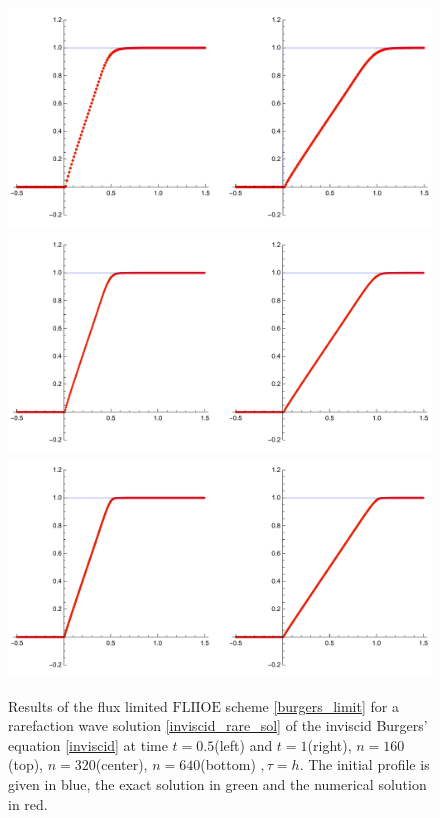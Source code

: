 \documentclass[../include.tex]{subfiles}
\begin{document}
\begin{figure}[H]
	\centering
	\includegraphics[width=.9\textwidth]{figures/inviscidRare_160_h}
	\includegraphics[width=.9\textwidth]{figures/inviscidRare_320_h}
	\includegraphics[width=.9\textwidth]{figures/inviscidRare_640_h}
	\caption{Results of the flux limited $\mathrm{FLIIOE}$ scheme \eqref{burgers_limit} for a rarefaction wave solution \eqref{inviscid_rare_sol} of the inviscid Burgers' equation \eqref{inviscid} at time $ t=0.5 $(left) and $ t=1 $(right), $ n=160 $(top), $ n = 320 $(center), $ n = 640 $(bottom) $, \tau=h $. The initial profile is given in blue, the exact solution in green and the numerical solution in red.}
	\label{fig:fliioe_shock_rare}
\end{figure}
\end{document}
